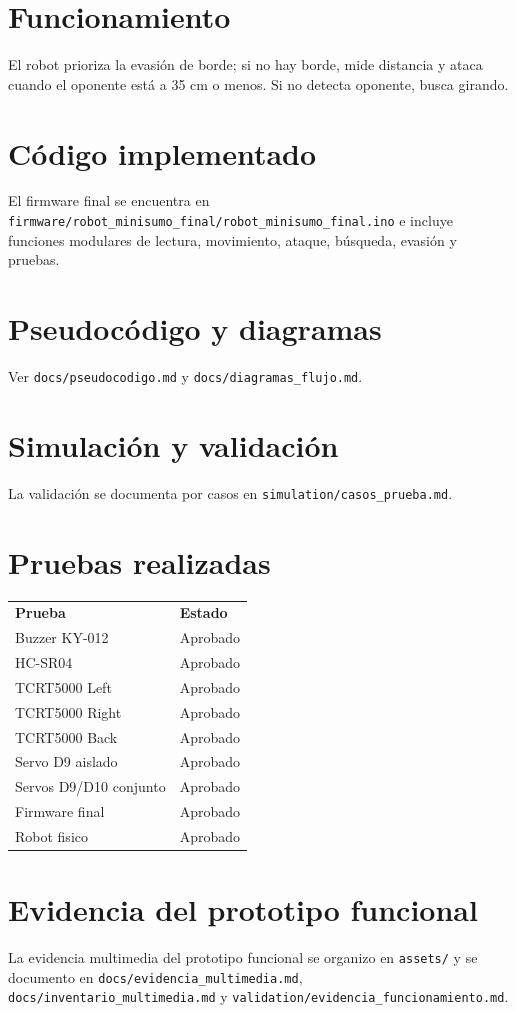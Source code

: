 \documentclass[12pt,letterpaper]{article}
\begin{document}
\section{Funcionamiento}
El robot prioriza la evasión de borde; si no hay borde, mide distancia y ataca cuando el oponente está a 35 cm o menos. Si no detecta oponente, busca girando.
\section{Código implementado}
El firmware final se encuentra en \texttt{firmware/robot\_minisumo\_final/robot\_minisumo\_final.ino} e incluye funciones modulares de lectura, movimiento, ataque, búsqueda, evasión y pruebas.
\section{Pseudocódigo y diagramas}
Ver \texttt{docs/pseudocodigo.md} y \texttt{docs/diagramas\_flujo.md}.
\section{Simulación y validación}
La validación se documenta por casos en \texttt{simulation/casos\_prueba.md}.
\section{Pruebas realizadas}
\begin{longtable}{p{9cm}p{5cm}}
\textbf{Prueba} & \textbf{Estado}\\
Buzzer KY-012 & Aprobado \\
HC-SR04 & Aprobado \\
TCRT5000 Left & Aprobado \\
TCRT5000 Right & Aprobado \\
TCRT5000 Back & Aprobado \\
Servo D9 aislado & Aprobado \\
Servos D9/D10 conjunto & Aprobado \\
Firmware final & Aprobado \\
Robot fisico & Aprobado \\
\end{longtable}
\section{Evidencia del prototipo funcional}
La evidencia multimedia del prototipo funcional se organizo en \texttt{assets/} y se documento en \texttt{docs/evidencia\_multimedia.md}, \texttt{docs/inventario\_multimedia.md} y \texttt{validation/evidencia\_funcionamiento.md}.
\end{document}
